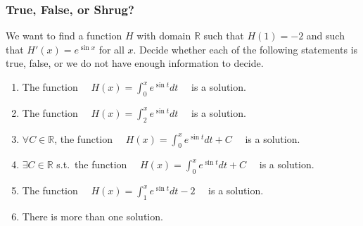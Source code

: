 \documentclass[14pt]{beamer}
\begin{document}
	\begin{frame}[t]
		\fontsize{11}{11}\selectfont
		\frametitle{True, False, or Shrug?}

		We want to find a function $H$ with domain $\mathbb{R}$ such that $\displaystyle
		H(1) = -2$ and such that $\displaystyle H'(x) = e^{\sin x}$ for all $x$.
		Decide whether each of the following statements is true, false, or we do not
		have enough information to decide.

		\begin{enumerate}
			\item The function $\displaystyle \quad H(x) = \int_{0}^{x}e^{\sin t}dt \quad$
				is a solution.

			\item The function $\displaystyle \quad H(x) = \int_{2}^{x}e^{\sin t}dt \quad$
				is a solution.

			\item $\forall C \in \mathbb{R}$, the function
				$\displaystyle \quad H(x) = \int_{0}^{x}e^{\sin t}dt + C \quad$ is a
				solution.

			\item $\exists C \in \mathbb{R}$ s.t.\ the function
				$\displaystyle \quad H(x) = \int_{0}^{x}e^{\sin t}dt + C \quad$ is a
				solution.

			\item The function $\displaystyle \quad H(x) = \int_{1}^{x}e^{\sin t}dt -2
				\quad$ is a solution.

			\item There is more than one solution.
		\end{enumerate}
	\end{frame}
\end{document}
